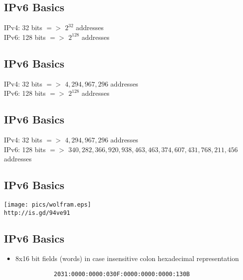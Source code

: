 \documentclass[xga]{xdvislides}
\begin{document}
\subsection{IPv6 Basics}
\Hugesize
\begin{center}
IPv4: 32 bits $=>$ $2^{32}$ addresses \\
\vspace{.5in}
IPv6: 128 bits $=>$ $2^{128}$ addresses
\end{center}
\Normalsize

\subsection{IPv6 Basics}
\Hugesize
\begin{center}
IPv4: 32 bits $=>$ $4,294,967,296$ addresses \\
\vspace{.5in}
IPv6: 128 bits $=>$ $2^{128}$ addresses
\end{center}
\Normalsize

\subsection{IPv6 Basics}
\Hugesize
\begin{center}
IPv4: 32 bits $=>$ $4,294,967,296$ addresses \\
\vspace{.5in}
IPv6: 128 bits $=>$ $340,282,366,920,938,463,463,374,607,431,768,211,456$ addresses \\
\vspace{.5in}
\end{center}
\Normalsize

\subsection{IPv6 Basics}
\vspace*{\fill}
\begin{center}
	\texttt{[image: pics/wolfram.eps]} \\
	\verb+http://is.gd/94ve91+
\end{center}
\vspace*{\fill}

\subsection{IPv6 Basics}
\begin{itemize}
	\item 8x16 bit fields (words) in case insensitive colon hexadecimal
		representation
\begin{verbatim}
           2031:0000:0000:030F:0000:0000:0000:130B
\end{verbatim}
\end{itemize}
\end{document}
